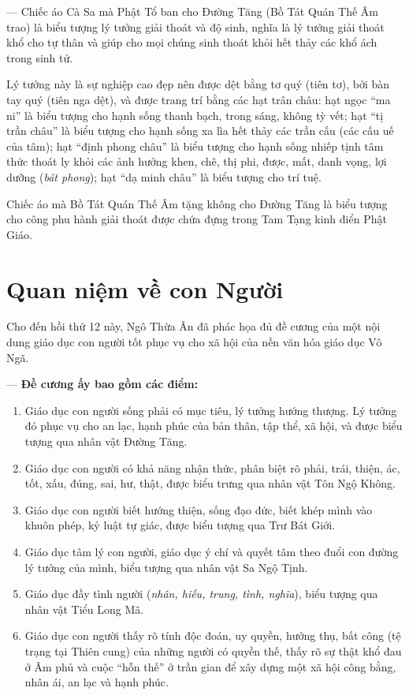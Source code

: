 — Chiếc áo Cà Sa mà Phật Tổ ban cho Đường Tăng (Bồ Tát Quán Thế Âm trao) là biểu tượng lý tưởng giải thoát và độ sinh, nghĩa là lý tưởng giải thoát khổ cho tự thân và giúp cho mọi chúng sinh thoát khỏi hết thảy các khổ ách trong sinh tử.

Lý tưởng này là sự nghiệp cao đẹp nên được dệt bằng tơ quý (tiên tơ), bởi bàn tay quý (tiên nga dệt), và được trang trí bằng các hạt trân châu: hạt ngọc ``ma ni'' là biểu tượng cho hạnh sống thanh bạch, trong sáng, không tỳ vết; hạt ``tị trần châu'' là biểu tượng cho hạnh sống xa lìa hết thảy các trần cấu (các cấu uế của tâm); hạt ``định phong châu'' là biểu tượng cho hạnh sống nhiếp tịnh tâm thức thoát ly khỏi các ảnh hưởng khen, chê, thị phi, được, mất, danh vọng, lợi dưỡng (\emph{bát phong}); hạt ``dạ minh châu'' là biểu tượng cho trí tuệ.

Chiếc áo mà Bồ Tát Quán Thế Âm tặng không cho Đường Tăng là biểu tượng cho công phu hành giải thoát được chứa đựng trong Tam Tạng kinh điển Phật Giáo.


\section{Quan niệm về con Người} %
\label{sec:9_con_nguoi}

Cho đến hồi thứ 12 này, Ngô Thừa Ân đã phác họa đủ đề cương của một nội dung giáo dục con người tốt phục vụ cho xã hội của nền văn hóa giáo dục Vô Ngã.

— {\bf Đề cương ấy bao gồm các điểm:}

\begin{enumerate}[label=\itshape\arabic*\upshape/]

    \item Giáo dục con người sống phải có mục tiêu, lý tưởng hướng thượng. Lý tưởng đó phục vụ cho an lạc, hạnh phúc của bản thân, tập thể, xã hội, và được biểu tượng qua nhân vật Đường Tăng.

    \item Giáo dục con người có khả năng nhận thức, phân biệt rõ phải, trái, thiện, ác, tốt, xấu, đúng, sai, hư, thật, được biểu trưng qua nhân vật Tôn Ngộ Không.

    \item Giáo dục con người biết hướng thiện, sống đạo đức, biết khép mình vào khuôn phép, kỷ luật tự giác, được biểu tượng qua Trư Bát Giới.

    \item Giáo dục tâm lý con người, giáo dục ý chí và quyết tâm theo đuổi con đường lý tưởng của mình, biểu tượng qua nhân vật Sa Ngộ Tịnh.

    \item Giáo dục đầy tình người (\emph{nhân, hiếu, trung, tình, nghĩa}), biểu tượng qua nhân vật Tiểu Long Mã.

    \item Giáo dục con người thấy rõ tính độc đoán, uy quyền, hưởng thụ, bất công (tệ trạng tại Thiên cung) của những người có quyền thế, thấy rõ sự thật khổ đau ở Âm phủ và cuộc ``hỗn thế'' ở trần gian để xây dựng một xã hội công bằng, nhân ái, an lạc và hạnh phúc.
\end{enumerate}

